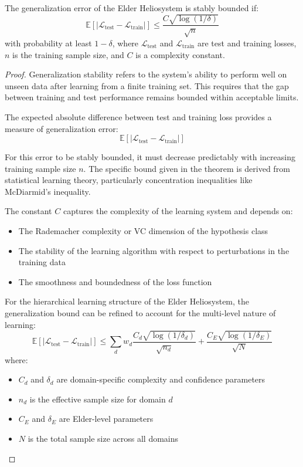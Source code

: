 \begin{theorem}
The generalization error of the Elder Heliosystem is stably bounded if:
\begin{equation}
\mathbb{E}[|\mathcal{L}_{\text{test}} - \mathcal{L}_{\text{train}}|] \leq \frac{C \sqrt{\log(1/\delta)}}{\sqrt{n}}
\end{equation}
with probability at least $1-\delta$, where $\mathcal{L}_{\text{test}}$ and $\mathcal{L}_{\text{train}}$ are test and training losses, $n$ is the training sample size, and $C$ is a complexity constant.
\end{theorem}

\begin{proof}
Generalization stability refers to the system's ability to perform well on unseen data after learning from a finite training set. This requires that the gap between training and test performance remains bounded within acceptable limits.

The expected absolute difference between test and training loss provides a measure of generalization error:
\begin{equation}
\mathbb{E}[|\mathcal{L}_{\text{test}} - \mathcal{L}_{\text{train}}|]
\end{equation}

For this error to be stably bounded, it must decrease predictably with increasing training sample size $n$. The specific bound given in the theorem is derived from statistical learning theory, particularly concentration inequalities like McDiarmid's inequality.

The constant $C$ captures the complexity of the learning system and depends on:
\begin{itemize}
    \item The Rademacher complexity or VC dimension of the hypothesis class
    \item The stability of the learning algorithm with respect to perturbations in the training data
    \item The smoothness and boundedness of the loss function
\end{itemize}

For the hierarchical learning structure of the Elder Heliosystem, the generalization bound can be refined to account for the multi-level nature of learning:
\begin{equation}
\mathbb{E}[|\mathcal{L}_{\text{test}} - \mathcal{L}_{\text{train}}|] \leq \sum_d w_d \frac{C_d \sqrt{\log(1/\delta_d)}}{\sqrt{n_d}} + \frac{C_E \sqrt{\log(1/\delta_E)}}{\sqrt{N}}
\end{equation}
where:
\begin{itemize}
    \item $C_d$ and $\delta_d$ are domain-specific complexity and confidence parameters
    \item $n_d$ is the effective sample size for domain $d$
    \item $C_E$ and $\delta_E$ are Elder-level parameters
    \item $N$ is the total sample size across all domains
\end{itemize}


\end{proof}
